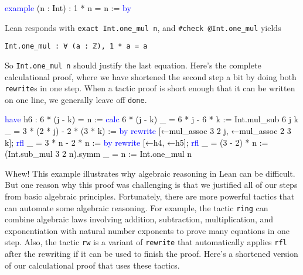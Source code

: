 \documentclass[
  letterpaper,
  DIV=11,
  numbers=noendperiod]{scrreprt}
\makeatletter
\newenvironment{Shaded}{\begin{snugshade}}{\end{snugshade}}
\newcommand{\DocumentationTok}[1]{\textcolor[rgb]{0.37,0.37,0.37}{\textit{#1}}}
\newcommand{\KeywordTok}[1]{\textcolor[rgb]{0.00,0.23,0.31}{#1}}
\newcommand{\NormalTok}[1]{\textcolor[rgb]{0.00,0.23,0.31}{#1}}
\newcommand{\SpecialCharTok}[1]{\textcolor[rgb]{0.37,0.37,0.37}{#1}}
\def\bluesquiggly{\bgroup \markoverwith{\textcolor[HTML]{1E90FF}{\lower3.5\p@\hbox{\sixly \char58}}}\ULon}
\renewcommand{\NormalTok}[1]{\textcolor[HTML]{000000}{#1}}
\renewcommand{\KeywordTok}[1]{\textcolor[HTML]{0000FF}{#1}}
\renewcommand{\SpecialCharTok}[1]{}
\renewcommand{\DocumentationTok}[1]{\bluesquiggly{\textcolor[HTML]{0000FF}{#1}}}
\newenvironment{ind}
	{\begin{list}{}{\setlength{\leftmargin}{1em}}\item\relax}
	{\end{list}}
\theoremstyle{remark}
\makeatother
\begin{document}
\begin{Shaded}
\begin{Highlighting}[]
\KeywordTok{example}\NormalTok{ (n : Int) : 1 * n = n := }\KeywordTok{by} \SpecialCharTok{++}\DocumentationTok{apply?}\SpecialCharTok{::}
\end{Highlighting}
\end{Shaded}

Lean responds with \texttt{exact\ Int.one\_mul\ n}, and
\texttt{\#check\ @Int.one\_mul} yields

\begin{ind}

\begin{verbatim}
Int.one_mul : ∀ (a : ℤ), 1 * a = a
\end{verbatim}

\end{ind}

So \texttt{Int.one\_mul\ n} should justify the last equation. Here's the
complete calculational proof, where we have shortened the second step a
bit by doing both \texttt{rewrite}s in one step. When a tactic proof is
short enough that it can be written on one line, we generally leave off
\texttt{done}.

\begin{Shaded}
\begin{Highlighting}[]
\KeywordTok{have}\NormalTok{ h6 : 6 * (j {-} k) = n :=}
  \KeywordTok{calc}\NormalTok{ 6 * (j {-} k)}
\NormalTok{    \_ = 6 * j {-} 6 * k := Int.mul\_sub 6 j k}
\NormalTok{    \_ = 3 * (2 * j) {-} 2 * (3 * k) := }\KeywordTok{by}
          \KeywordTok{rewrite}\NormalTok{ [←mul\_assoc 3 2 j, ←mul\_assoc 2 3 k]; }\KeywordTok{rfl}
\NormalTok{    \_ = 3 * n {-} 2 * n := }\KeywordTok{by} \KeywordTok{rewrite}\NormalTok{ [←h4, ←h5]; }\KeywordTok{rfl}
\NormalTok{    \_ = (3 {-} 2) * n := (Int.sub\_mul 3 2 n).symm}
\NormalTok{    \_ = n := Int.one\_mul n}
\end{Highlighting}
\end{Shaded}

Whew! This example illustrates why algebraic reasoning in Lean can be
difficult. But one reason why this proof was challenging is that we
justified all of our steps from basic algebraic principles. Fortunately,
there are more powerful tactics that can automate some algebraic
reasoning. For example, the tactic \texttt{ring} can combine algebraic
laws involving addition, subtraction, multiplication, and exponentiation
with natural number exponents to prove many equations in one step. Also,
the tactic \texttt{rw} is a variant of \texttt{rewrite} that
automatically applies \texttt{rfl} after the rewriting if it can be used
to finish the proof. Here's a shortened version of our calculational
proof that uses these tactics.
\end{document}
